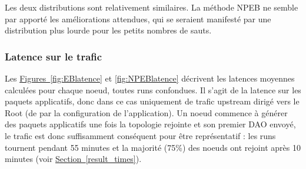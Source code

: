 \documentclass[]{report}
\newcommand{\wordlink}[2]{\hyperref[#2]{#1~\ref{#2}}}
\begin{document}
\vspace{0.2cm}

Les deux distributions sont relativement similaires. La méthode NPEB ne semble par apporté les améliorations attendues, qui se seraient manifesté par une distribution plus lourde pour les petits nombres de sauts. 

\subsubsection{Latence sur le trafic}
\label{results_latence}

Les \wordlink{Figures}{fig:EBlatence} et \ref{fig:NPEBlatence} décrivent les latences moyennes calculées pour chaque noeud, toutes runs confondues. Il s'agit de la latence sur les paquets applicatifs, donc dans ce cas uniquement de trafic upstream dirigé vers le Root (de par la configuration de l'application). Un noeud commence à générer des paquets applicatifs une fois la topologie rejointe et son premier DAO envoyé, le trafic est donc suffisamment conséquent pour être représentatif : les runs tournent pendant 55 minutes et la majorité (75\%) des noeuds ont rejoint après 10 minutes (voir \wordlink{Section}{result_times}).
\end{document}

